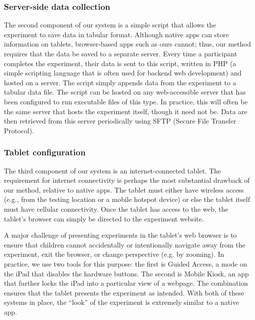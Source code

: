 \documentclass[man,noapacite]{apa2}
\begin{document}

\subsubsection{Server-side data collection}

The second component of our system is a simple script that allows the experiment to save data in tabular format. Although native apps can store information on tablets, browser-based apps such as ours cannot; thus, our method requires that the data be saved to a separate server. Every time a participant completes the experiment, their data is sent to this script, written in PHP (a simple scripting language that is often used for backend web development) and hosted on a server. The script simply appends data from the experiment to a tabular data file. The script can be hosted on any web-accessible server that has been configured to run executable files of this type. In practice, this will often be the same server that hosts the experiment itself, though it need not be. Data are then retrieved from this server periodically using SFTP (Secure File Transfer Protocol). 

\subsubsection{Tablet configuration}

The third component of our system is an internet-connected tablet. The requirement for internet connectivity is perhaps the most substantial drawback of our method, relative to native apps. The tablet must either have wireless access (e.g., from the testing location or a mobile hotspot device) or else the tablet itself must have cellular connectivity. Once the tablet has access to the web, the tablet's browser can simply be directed to the experiment website. 

A major challenge of presenting experiments in the tablet's web browser is to ensure that children cannot accidentally or intentionally navigate away from the experiment, exit the browser, or change perspective (e.g. by zooming). In practice, we use two tools for this purpose: the first is Guided Access, a mode on the iPad that disables the hardware buttons. The second is Mobile Kiosk, an app that further locks the iPad into a particular view of a webpage. The combination ensures that the tablet presents the experiment as intended. With both of these systems in place, the ``look'' of the experiment is extremely similar to a native app. 
\end{document}
